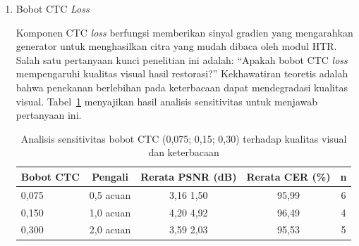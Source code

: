 \documentclass[12pt,a4paper]{article}
\begin{document}
\begin{enumerate}[leftmargin=1.5em, labelsep=0.5em, itemindent=0pt, label=\arabic*., topsep=0pt, partopsep=0pt]
\begin{enumerate}[leftmargin=1.5em, labelsep=0.5em, itemindent=0pt, topsep=0.5em, label=\alph*.]
        Hasil analisis menunjukkan bahwa peningkatan bobot dari 50 ke 100 (2\texttimes{} acuan) menghasilkan peningkatan PSNR sebesar 118\% (dari 2,40 dB ke 5,25 dB), dengan efek samping perbaikan CER (92,14\% berbanding 99,02\%). Bobot piksel 100 menempati 4 dari 5 posisi teratas pada \textit{grid search}, mengonfirmasi dominasinya dalam optimasi visual. Meskipun demikian, konfigurasi produksi menggunakan bobot 50 untuk menjaga keseimbangan dengan komponen lain dalam konvergensi jangka panjang. Pelatihan produksi dengan bobot piksel 50 mencapai PSNR 30,91 dB, menunjukkan bahwa bobot moderat memadai ketika dikombinasikan dengan \textit{curriculum learning}. Perlu diperhatikan bahwa bobot 100 berisiko mendominasi sinyal gradien sehingga dapat menghambat pembelajaran fitur semantik dari komponen CTC dan RecFeat.

        \item Bobot CTC \textit{Loss}
        
        Komponen CTC \textit{loss} berfungsi memberikan sinyal gradien yang mengarahkan generator untuk menghasilkan citra yang mudah dibaca oleh modul HTR. Salah satu pertanyaan kunci penelitian ini adalah: ``Apakah bobot CTC \textit{loss} mempengaruhi kualitas visual hasil restorasi?'' Kekhawatiran teoretis adalah bahwa penekanan berlebihan pada keterbacaan dapat mendegradasi kualitas visual. Tabel~\ref{tab:ctc-sensitivity} menyajikan hasil analisis sensitivitas untuk menjawab pertanyaan ini.

        \begin{table}[!htbp]
            \caption[Sensitivitas bobot CTC]{Analisis sensitivitas bobot CTC (0,075; 0,15; 0,30) terhadap kualitas visual dan keterbacaan}
            \label{tab:ctc-sensitivity}
            \normalsize
            \begin{tabular}{lcccc}
                \hline
                \textbf{Bobot CTC} & \textbf{Pengali}    & \textbf{Rerata PSNR (dB)} & \textbf{Rerata CER (\%)} & \textbf{n} \\
                \hline
                0,075      & 0,5\texttimes{} acuan & 3,16 \textpm{} 1,50   & 95,99        & 6 \\
                0,150      & 1,0\texttimes{} acuan & 4,20 \textpm{} 4,92   & 96,49        & 4 \\
                0,300      & 2,0\texttimes{} acuan & 3,59 \textpm{} 2,03   & 95,53        & 5 \\
                \hline
            \end{tabular}
        \end{table}


\end{enumerate}
\end{enumerate}
\end{document}
